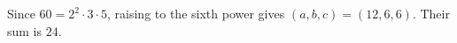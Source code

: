 Since $ 60=2^2\cdot3\cdot5 $, raising to the sixth power gives $(a,b,c)=(12,6,6)$. Their sum is $\boxed{24}$.
